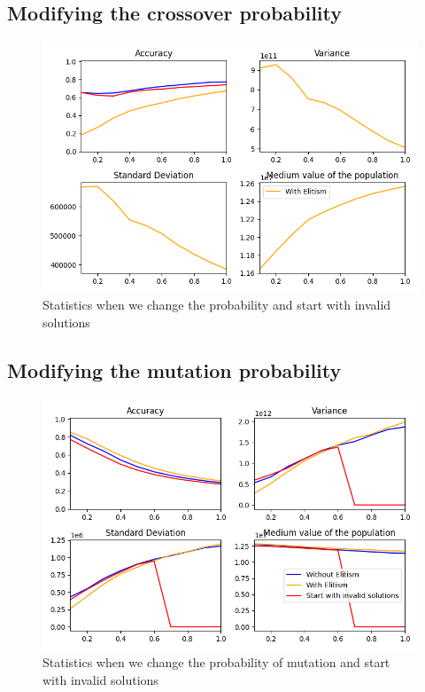 \documentclass{article}
\begin{document}
    
    
    \subsection*{Modifying the crossover probability}

    \begin{figure}[H]

        \centering
        \includegraphics[width=1\textwidth]{../media/ej1/04.CrossoverProb_withInvSols_behaviour.png}
        \caption{Statistics when we change the probability and start with invalid solutions}
        \label{Statistics when we change the probability of crossover and start with invalid solutions}

    \end{figure}

    
    \subsection*{Modifying the mutation probability}

    \begin{figure}[H]

        \centering
        \includegraphics[width=1\textwidth]{../media/ej1/05.MutationProb_withInvSols_behaviour.png}
        \caption{Statistics when we change the probability of mutation and start with invalid solutions}
        \label{Statistics when we change the probability of mutation and start with invalid solutions}

    \end{figure}
\end{document}
